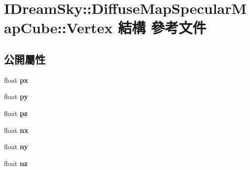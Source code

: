 \hypertarget{struct_i_dream_sky_1_1_diffuse_map_specular_map_cube_1_1_vertex}{}\section{I\+Dream\+Sky\+:\+:Diffuse\+Map\+Specular\+Map\+Cube\+:\+:Vertex 結構 參考文件}
\label{struct_i_dream_sky_1_1_diffuse_map_specular_map_cube_1_1_vertex}
\subsection*{公開屬性}
\begin{DoxyCompactItemize}
\item 
float {\bfseries px}\hypertarget{struct_i_dream_sky_1_1_diffuse_map_specular_map_cube_1_1_vertex_aced0aeaf5efd62c41221c5737eed1621}{}\label{struct_i_dream_sky_1_1_diffuse_map_specular_map_cube_1_1_vertex_aced0aeaf5efd62c41221c5737eed1621}

\item 
float {\bfseries py}\hypertarget{struct_i_dream_sky_1_1_diffuse_map_specular_map_cube_1_1_vertex_a955092a3179e2dd2d648a3c5c96081c0}{}\label{struct_i_dream_sky_1_1_diffuse_map_specular_map_cube_1_1_vertex_a955092a3179e2dd2d648a3c5c96081c0}

\item 
float {\bfseries pz}\hypertarget{struct_i_dream_sky_1_1_diffuse_map_specular_map_cube_1_1_vertex_ae7bbbef46fe4835071f6dd63f5fb5dac}{}\label{struct_i_dream_sky_1_1_diffuse_map_specular_map_cube_1_1_vertex_ae7bbbef46fe4835071f6dd63f5fb5dac}

\item 
float {\bfseries nx}\hypertarget{struct_i_dream_sky_1_1_diffuse_map_specular_map_cube_1_1_vertex_a4a97b88e4df977cefbb5878fce03dd85}{}\label{struct_i_dream_sky_1_1_diffuse_map_specular_map_cube_1_1_vertex_a4a97b88e4df977cefbb5878fce03dd85}

\item 
float {\bfseries ny}\hypertarget{struct_i_dream_sky_1_1_diffuse_map_specular_map_cube_1_1_vertex_a1f2319f211bc46a10f6ee42b8b35d413}{}\label{struct_i_dream_sky_1_1_diffuse_map_specular_map_cube_1_1_vertex_a1f2319f211bc46a10f6ee42b8b35d413}

\item 
float {\bfseries nz}\hypertarget{struct_i_dream_sky_1_1_diffuse_map_specular_map_cube_1_1_vertex_a692ed5af42cb1f31d29fc9b590afa01d}{}\label{struct_i_dream_sky_1_1_diffuse_map_specular_map_cube_1_1_vertex_a692ed5af42cb1f31d29fc9b590afa01d}


\end{DoxyCompactItemize}
